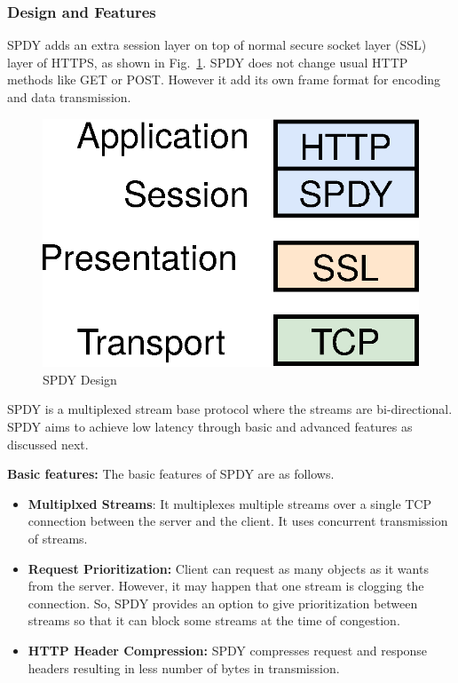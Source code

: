 \subsubsection{Design and Features}
SPDY adds an extra session layer on top of normal secure socket layer (SSL) layer of HTTPS, as shown in Fig.~\ref{fig:spdy.design}. SPDY does not change usual HTTP methods like GET or POST. However it add its own frame format for encoding and data transmission. 
\begin{figure}[!ht]
    \centering
    \includegraphics[width=0.2\linewidth]{img/spdy/spdy_design}
    \caption{SPDY Design}
    \label{fig:spdy.design}
\end{figure}
SPDY is a multiplexed stream base protocol where the streams are bi-directional. SPDY aims to achieve low latency through basic and advanced features as discussed next.

\noindent \textbf{Basic features:} The basic features of SPDY are as follows. 
\begin{itemize}
    \item \textbf{Multiplxed Streams}: It multiplexes multiple streams over a single TCP connection between the server and the client. It uses concurrent transmission of streams.
    \item \textbf{Request Prioritization:} Client can request as many objects as it wants from the server. However, it may happen that one stream is clogging the connection. So, SPDY provides an option to give prioritization between streams so that it can block some streams at the time of congestion.
    \item \textbf{HTTP Header Compression:} SPDY compresses request and response headers resulting in less number of bytes in transmission.
\end{itemize}

